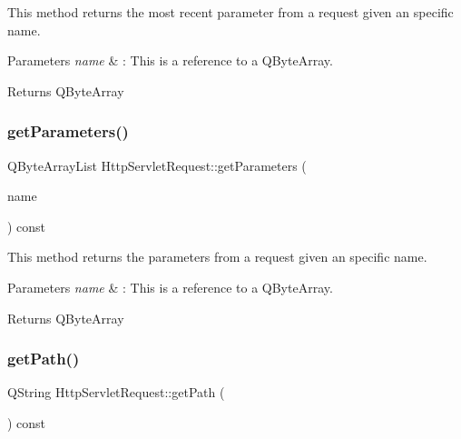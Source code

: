 This method returns the most recent parameter from a request given an specific name. 


\begin{DoxyParams}{Parameters}
{\em name} & \+: This is a reference to a Q\+Byte\+Array. \\
\hline
\end{DoxyParams}
\begin{DoxyReturn}{Returns}
Q\+Byte\+Array 
\end{DoxyReturn}
\mbox{\label{class_http_servlet_request_ab361a363bdd6d627aecba897dd12809b}} 
\subsubsection{\texorpdfstring{get\+Parameters()}{getParameters()}}
{\footnotesize\ttfamily Q\+Byte\+Array\+List Http\+Servlet\+Request\+::get\+Parameters (\begin{DoxyParamCaption}\item[{const Q\+Byte\+Array \&}]{name }\end{DoxyParamCaption}) const\hspace{0.3cm}{\ttfamily [inline]}}



This method returns the parameters from a request given an specific name. 


\begin{DoxyParams}{Parameters}
{\em name} & \+: This is a reference to a Q\+Byte\+Array. \\
\hline
\end{DoxyParams}
\begin{DoxyReturn}{Returns}
Q\+Byte\+Array 
\end{DoxyReturn}
\mbox{\label{class_http_servlet_request_a99e9035246e9ba9701f4f0a435c2161c}} 
\subsubsection{\texorpdfstring{get\+Path()}{getPath()}}
{\footnotesize\ttfamily Q\+String Http\+Servlet\+Request\+::get\+Path (\begin{DoxyParamCaption}{ }\end{DoxyParamCaption}) const\hspace{0.3cm}{\ttfamily [inline]}}



